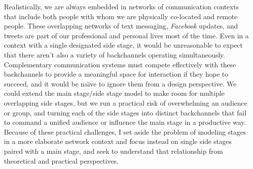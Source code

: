 Realistically, we are always embedded in networks of communication contexts that include both people with whom we are physically co-located and remote people. These overlapping networks of text messaging, \emph{Facebook} updates, and tweets are part of our professional and personal lives most of the time. Even in a context with a single designated side stage, it would be unreasonable to expect that there aren't also a variety of backchannels operating simultaneously. Complementary communication systems must compete effectively with these backchannels to provide a meaningful space for interaction if they hope to succeed, and it would be na\"{\i}ve to ignore them from a design perspective. We could extend the main stage/side stage model to make room for multiple overlapping side stages, but we run a practical risk of overwhelming an audience or group, and turning each of the side stages into distinct backchannels that fail to command a unified audience or influence the main stage in a productive way. Because of these practical challenges, I set aside the problem of modeling stages in a more elaborate network context and focus instead on single side stages paired with a main stage, and seek to understand that relationship from theoretical and practical perspectives.










